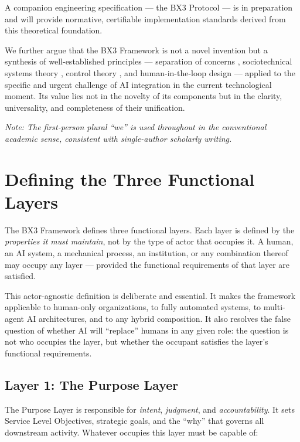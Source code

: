 \documentclass[12pt]{article}
\theoremstyle{plain}
\begin{document}
A companion engineering specification --- the BX3 Protocol --- is in preparation and will provide normative, certifiable implementation standards derived from this theoretical foundation.

We further argue that the BX3 Framework is not a novel invention but a synthesis of well-established principles --- separation of concerns \cite{dijkstra1982}, sociotechnical systems theory \cite{trist1981}, control theory \cite{wiener1948}, and human-in-the-loop design \cite{bansal2019} --- applied to the specific and urgent challenge of AI integration in the current technological moment. Its value lies not in the novelty of its components but in the clarity, universality, and completeness of their unification.

\textit{Note: The first-person plural ``we'' is used throughout in the conventional academic sense, consistent with single-author scholarly writing.}

\section{Defining the Three Functional Layers}
\label{sec:layers}

The BX3 Framework defines three functional layers. Each layer is defined by the \textit{properties it must maintain}, not by the type of actor that occupies it. A human, an AI system, a mechanical process, an institution, or any combination thereof may occupy any layer --- provided the functional requirements of that layer are satisfied.

This actor-agnostic definition is deliberate and essential. It makes the framework applicable to human-only organizations, to fully automated systems, to multi-agent AI architectures, and to any hybrid composition. It also resolves the false question of whether AI will ``replace'' humans in any given role: the question is not who occupies the layer, but whether the occupant satisfies the layer's functional requirements.

\subsection{Layer 1: The Purpose Layer}

The Purpose Layer is responsible for \textit{intent}, \textit{judgment}, and \textit{accountability}. It sets Service Level Objectives, strategic goals, and the ``why'' that governs all downstream activity. Whatever occupies this layer must be capable of:
\end{document}
